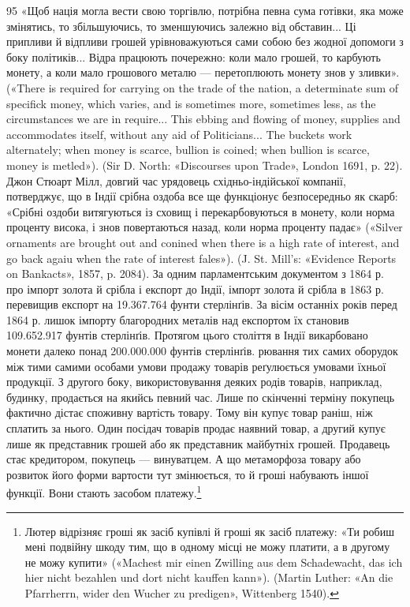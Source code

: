 95 «Щоб нація могла вести свою торгівлю, потрібна певна сума
готівки, яка може змінятись, то збільшуючись, то зменшуючись залежно
від обставин... Ці припливи й відпливи грошей урівноважуються
сами собою без жодної допомоги з боку політиків... Відра працюють почережно:
коли мало грошей, то карбують монету, а коли мало грошового
металю — перетоплюють монету знов у зливки». («There is required for
carrying on the trade of the nation, a determinate sum of specifick money,
which varies, and is sometimes more, sometimes less, as the circumstances
we are in require... This ebbing and flowing of money, supplies and accommodates
itself, without any aid of Politicians... The buckets work alternately;
when money is scarce, bullion is coined; when bullion is scarce, money
is metled»). (Sir D. North: «Discourses upon Trade», London 1691, p. 22).
Джон Стюарт Мілл, довгий час урядовець східньо-індійської компанії,
потверджує, що в Індії срібна оздоба все ще функціонує безпосередньо як
скарб: «Срібні оздоби витягуються із сховищ і перекарбовуються в монету,
коли норма проценту висока, і знов повертаються назад, коли норма проценту
падає» («Silver ornaments are brought out and conined when there
is a high rate of interest, and go back agaiu when the rate of interest fales»).
(J. St. Mill’s: «Evidence Reports on Bankacts», 1857, p. 2084). За одним
парламентським документом з 1864 р. про імпорт золота й срібла і експорт
до Індії, імпорт золота й срібла в 1863 р. перевищив експорт на 19.367.764
фунти стерлінґів. За вісім останніх років перед 1864 р. лишок імпорту
благородних металів над експортом їх становив 109.652.917 фунтів стерлінґів.
Протягом цього століття в Індії викарбовано монети далеко понад
200.000.000 фунтів стерлінґів.
рювання тих самих оборудок між тими самими особами умови продажу товарів реґулюється умовами їхньої
продукції. З другого боку, використовування деяких родів товарів, наприклад, будинку, продається на
якийсь певний час. Лише по скінченні терміну покупець фактично дістає споживну вартість товару. Тому
він купує товар раніш, ніж сплатить за нього. Один посідач товарів продає наявний товар, а другий
купує лише як представник грошей або як представник майбутніх грошей. Продавець стає кредитором,
покупець — винуватцем. А що метаморфоза товару або розвиток його форми вартости тут змінюється, то й
гроші набувають іншої функції. Вони стають засобом платежу.\footnote{
Лютер відрізняє гроші як засіб купівлі й гроші як засіб платежу:
«Ти робиш мені подвійну шкоду тим, що в одному місці не можу платити,
а в другому не можу купити» («Machest mir einen Zwilling aus dem Schadewacht,
das ich hier nicht bezahlen und dort nicht kauffen kann»). (Martin Luther:
«An die Pfarrherrn, wider den Wucher zu predigen», Wittenberg 1540).
}

